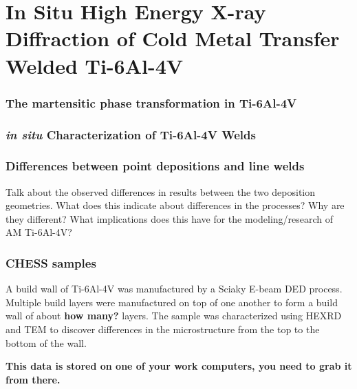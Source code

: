 \chapter{In Situ High Energy X-ray Diffraction of Cold Metal Transfer Welded Ti-6Al-4V}


\subsection{The martensitic phase transformation in Ti-6Al-4V}


\subsection{\textit{in situ} Characterization of Ti-6Al-4V Welds}



\subsection{Differences between point depositions and line welds}
Talk about the observed differences in results between the two deposition geometries. What does this indicate about differences in the processes? Why are they different? What implications does this have for the modeling/research of AM Ti-6Al-4V?

\subsection{CHESS samples}
A build wall of Ti-6Al-4V was manufactured by a Sciaky E-beam DED process. Multiple build layers were manufactured on top of one another to form a build wall of about \textbf{how many?} layers. The sample was characterized using HEXRD and TEM to discover differences in the microstructure from the top to the bottom of the wall.

\textbf{This data is stored on one of your work computers, you need to grab it from there.}

